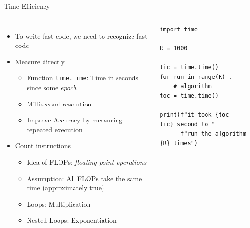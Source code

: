 
\begin{frame}[fragile]{Time Efficiency}
%
\begin{columns}[T]
\begin{itemize}
\item To write fast code, we need to recognize fast code
\item Measure directly
	\begin{itemize}
	\item Function \texttt{time.time}: Time in seconds since some \emph{epoch}
	\item Millisecond resolution
	\item Improve Accuracy by measuring repeated execution
	\end{itemize}
\item Count instructions
\begin{itemize}
\item Idea of FLOPs: \emph{floating point operations}
\item Assumption: All FLOPs take the same time (approximately true)
\item Loops: Multiplication
\item Nested Loops: Exponentiation
\end{itemize}
\end{itemize}
%
\begin{codebox}
\begin{verbatim}
import time

R = 1000

tic = time.time()
for run in range(R) :
    # algorithm
toc = time.time()

print(f"it took {toc - tic} second to "
      f"run the algorithm {R} times")
\end{verbatim}
\end{codebox}

\end{columns}
%
\end{frame}


